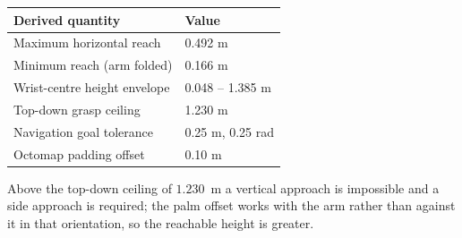 \documentclass[11pt,a4paper]{article}
\begin{document}
\begin{table}[h]
\centering
\begin{tabular}{ll}
\toprule
Derived quantity & Value \\
\midrule
Maximum horizontal reach & 0.492 m \\
Minimum reach (arm folded) & 0.166 m \\
Wrist-centre height envelope & 0.048 -- 1.385 m \\
Top-down grasp ceiling & 1.230 m \\
Navigation goal tolerance & 0.25 m, 0.25 rad \\
Octomap padding offset & 0.10 m \\
\bottomrule
\end{tabular}
\end{table}

Above the top-down ceiling of $1.230$~m a vertical approach is impossible and a
side approach is required; the palm offset works with the arm rather than against
it in that orientation, so the reachable height is greater.
\end{document}
